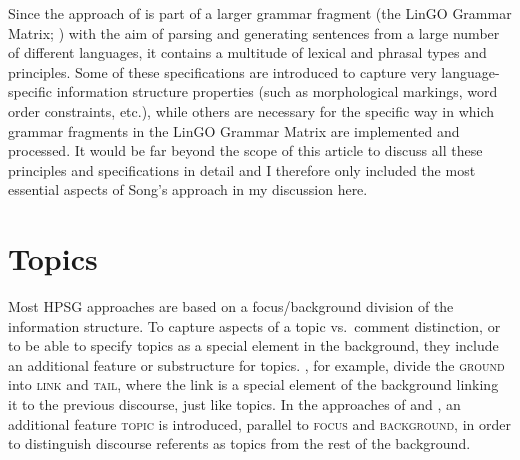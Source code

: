 \documentclass[output=paper
                ,modfonts
                ,nonflat
	        ,collection
	        ,collectionchapter
	        ,collectiontoclongg
 	        ,biblatex
                ,babelshorthands
                ,newtxmath
                ,draftmode
                ,colorlinks, citecolor=brown
]{./langsci/langscibook}
\begin{document}
Since the approach of \cite{song2018} is part of a larger grammar
fragment (the LinGO Grammar Matrix; \citealt{BDFPS2010a-u}) with the aim
of parsing and generating sentences from a large number of different
languages, it contains a multitude of lexical and phrasal types and
principles. Some of these specifications are introduced to capture
very language-specific information structure properties (such as
morphological markings, word order constraints, etc.), while others are
necessary for the specific way in which grammar fragments in the LinGO
Grammar Matrix are implemented and processed. It would be far beyond
the scope of this article to discuss all these principles and
specifications in detail and I therefore only included the most
essential aspects of Song's approach in my discussion here.

\section{Topics}
\label{sec:topic}

Most HPSG approaches are based on a focus/background division of the
information structure. To capture aspects of a topic vs.\ comment
distinction, or to be able to specify topics as a special element in
the background, they include an additional feature or substructure for
topics. \cite{EV96a}, for example, divide the \textsc{ground} into
\textsc{link} and \textsc{tail}, where the link is a special element
of the background linking it to the previous discourse, just like
topics. In the approaches of \cite{deKuthy2002a} and \cite{Paggio2009a-u}, an additional feature
\textsc{topic} is introduced, parallel to \textsc{focus} and
\textsc{background}, in order to distinguish discourse referents as
topics from the rest of the background.
\end{document}
